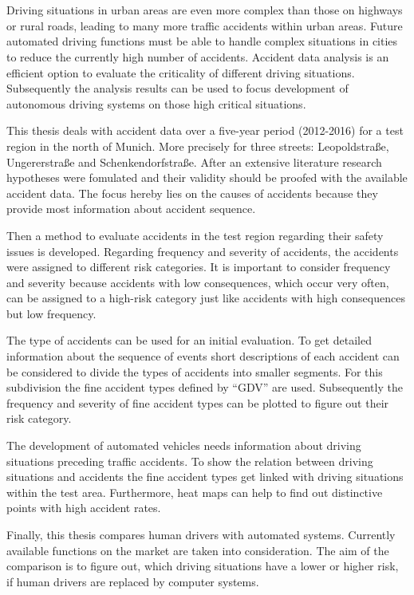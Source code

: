 \chapter{\abstractname}

Driving situations in urban areas are even more complex than those on highways or rural roads, leading to many more traffic accidents within urban areas. Future automated driving functions must be able to handle complex situations in cities to reduce the currently high number of accidents. Accident data analysis is an efficient option to evaluate the criticality of different driving situations. Subsequently the analysis results can be used to focus development of autonomous driving systems on those high critical situations.

This thesis deals with accident data over a five-year period (2012-2016) for a test region in the north of Munich. More precisely for three streets: Leopoldstraße, Ungererstraße and Schenkendorfstraße. After an extensive literature research hypotheses were fomulated and their validity should be proofed with the available accident data. The focus hereby lies on the causes of accidents because they provide most information about accident sequence.

Then a method to evaluate accidents in the test region regarding their safety issues is developed. Regarding frequency and severity of accidents, the accidents were assigned to different risk categories. It is important to consider frequency and severity because accidents with low consequences, which occur very often, can be assigned to a high-risk category just like accidents with high consequences but low frequency.

The type of accidents can be used for an initial evaluation. To get detailed information about the sequence of events short descriptions of each accident can be considered to divide the types of accidents into smaller segments. For this subdivision the fine accident types defined by \enquote{\acf{GDV}} are used. Subsequently the frequency and severity of fine accident types can be plotted to figure out their risk category.

The development of automated vehicles needs information about driving situations preceding traffic accidents. To show the relation between driving situations and accidents the fine accident types get linked with driving situations within the test area. Furthermore, heat maps can help to find out distinctive points with high accident rates.

Finally, this thesis compares human drivers with automated systems. Currently available functions on the market are taken into consideration. The aim of the comparison is to figure out, which driving situations have a lower or higher risk, if human drivers are replaced by computer systems.
